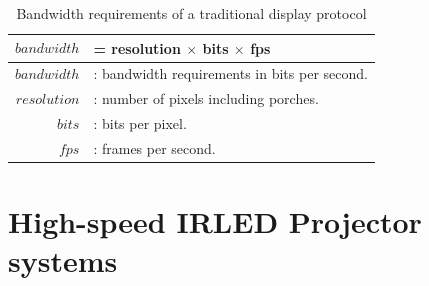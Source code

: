     \begin{table}
        \centering
        \large
        \begin{tabular}{| r l |}
            \hline
            $$bandwidth$$ & = resolution $\times$ bits $\times$ fps \\ \hline
            $bandwidth$ & : bandwidth requirements in bits per second. \\
            $resolution$ & : number of pixels including porches. \\
            $bits$ & : bits per pixel. \\
            $fps$ & : frames per second. \\
            \hline
        \end{tabular}
        \caption{Bandwidth requirements of a traditional display protocol}
        \label{tbl:bandwidth}
    \end{table}

\section{High-speed IRLED Projector systems}
%

